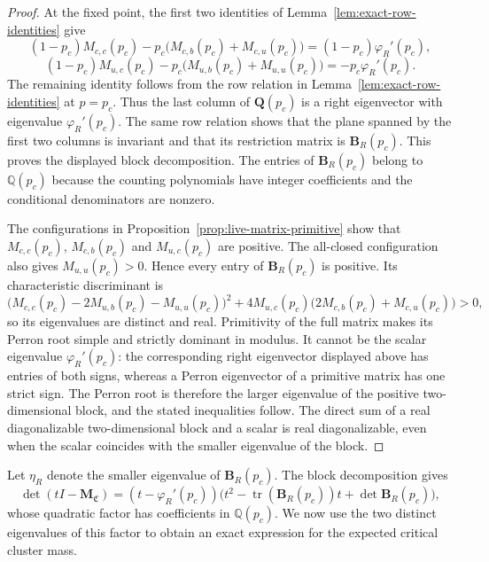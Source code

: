 \documentclass[scheme=plain,11pt]{ctexart}
\theoremstyle{definition}
\theoremstyle{remark}
\begin{document}
\begin{proof}
At the fixed point, the first two identities of Lemma~\ref{lem:exact-row-identities} give
\[
 (1-p_c)M_{c,c}(p_c)
 -p_c\bigl(M_{c,b}(p_c)+M_{c,u}(p_c)\bigr)
 =(1-p_c)\varphi_R'(p_c),
\]
\[
 (1-p_c)M_{u,c}(p_c)
 -p_c\bigl(M_{u,b}(p_c)+M_{u,u}(p_c)\bigr)
 =-p_c\varphi_R'(p_c).
\]
The remaining identity follows from the row relation in Lemma~\ref{lem:exact-row-identities} at $p=p_c$.
Thus the last column of $\mathbf Q(p_c)$ is a right eigenvector with eigenvalue $\varphi_R'(p_c)$.
The same row relation shows that the plane spanned by the first two columns is invariant and that its restriction matrix is $\mathbf B_R(p_c)$.
This proves the displayed block decomposition.
The entries of $\mathbf B_R(p_c)$ belong to $\mathbb Q(p_c)$ because the counting polynomials have integer coefficients and the conditional denominators are nonzero.

The configurations in Proposition~\ref{prop:live-matrix-primitive} show that $M_{c,c}(p_c)$, $M_{c,b}(p_c)$ and $M_{u,c}(p_c)$ are positive.
The all-closed configuration also gives $M_{u,u}(p_c)>0$.
Hence every entry of $\mathbf B_R(p_c)$ is positive.
Its characteristic discriminant is
\[
 \bigl(M_{c,c}(p_c)-2M_{u,b}(p_c)-M_{u,u}(p_c)\bigr)^2
 +4M_{u,c}(p_c)\bigl(2M_{c,b}(p_c)+M_{c,u}(p_c)\bigr)>0,
\]
so its eigenvalues are distinct and real.
Primitivity of the full matrix makes its Perron root simple and strictly dominant in modulus.
It cannot be the scalar eigenvalue $\varphi_R'(p_c)$: the corresponding right eigenvector displayed above has entries of both signs, whereas a Perron eigenvector of a primitive matrix has one strict sign.
The Perron root is therefore the larger eigenvalue of the positive two-dimensional block, and the stated inequalities follow.
The direct sum of a real diagonalizable two-dimensional block and a scalar is real diagonalizable, even when the scalar coincides with the smaller eigenvalue of the block.
\end{proof}


Let $\eta_R$ denote the smaller eigenvalue of $\mathbf B_R(p_c)$.
The block decomposition gives
\[
 \det(tI-\mathbf M_{\mathfrak C})
 =(t-\varphi_R'(p_c))
 \bigl(t^2-\operatorname{tr}(\mathbf B_R(p_c))t+\det\mathbf B_R(p_c)\bigr),
\]
whose quadratic factor has coefficients in $\mathbb Q(p_c)$.
We now use the two distinct eigenvalues of this factor to obtain an exact expression for the expected critical cluster mass.
\end{document}
